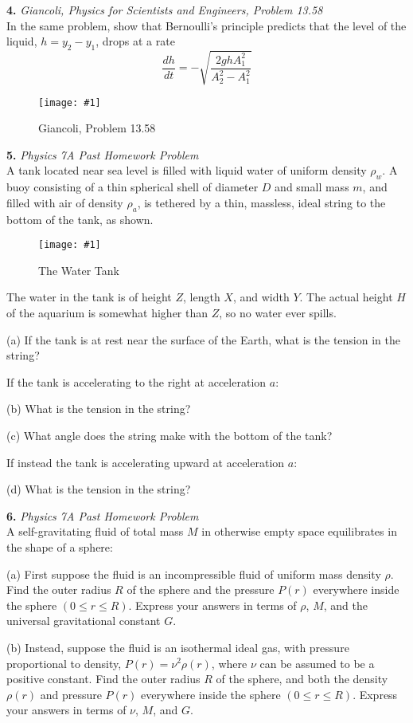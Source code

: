 \documentclass[11pt]{article}
\newcommand{\fig}[4]{
    \begin{figure}[H]
        \centering
        \texttt{[image: \#1]}
        \caption{#2}
        \label{exp4fit}
    \end{figure}
}
\theoremstyle{gangnamstyle}{\newtheorem{definition}{Definition}[]}
\theoremstyle{gangnamstyle}{\newtheorem{example}{Example}[]}
\theoremstyle{gangnamstyle}{\newtheorem{problem}{Problem}[]}
\begin{document}
\pagebreak

\textbf{4.} \textit{Giancoli, Physics for Scientists and Engineers, Problem 13.58} \\
In the same problem, show that Bernoulli’s principle predicts that the level of the liquid, $h = y_2 - y_1$, drops at a rate
\[ \frac{dh}{dt} = -\sqrt{\frac{2ghA_1^2}{A_2^2 - A_1^2}} \]

\fig{figs/0801/tank.png}{Giancoli, Problem 13.58}{0.6}{0}

\pagebreak

\textbf{5.} \textit{Physics 7A Past Homework Problem} \\
A tank located near sea level is filled with liquid water of uniform density $\rho_w$. A buoy consisting of a thin spherical shell of diameter $D$ and small mass $m$, and filled with air of density $\rho_a$, is tethered by a thin, massless, ideal string to the bottom of the tank, as shown. 

\fig{figs/0801/float.png}{The Water Tank}{0.65}{0}

The water in the tank is of height $Z$, length $X$, and width $Y$. The actual height $H$ of the aquarium is somewhat higher than $Z$, so no water ever spills.

(a) If the tank is at rest near the surface of the Earth, what is the tension in the string?

If the tank is accelerating to the right at acceleration $a$:

(b) What is the tension in the string?

(c) What angle does the string make with the bottom of the tank?

If instead the tank is accelerating upward at acceleration $a$:

(d) What is the tension in the string?

\pagebreak

\textbf{6.} \textit{Physics 7A Past Homework Problem} \\
A self-gravitating fluid of total mass $M$ in otherwise empty space equilibrates in the shape of a sphere:

(a) First suppose the fluid is an incompressible fluid of uniform mass density $\rho$. Find the outer radius $R$ of the sphere and the pressure $P(r)$ everywhere inside the sphere $(0 \leq r \leq R)$. Express your answers in terms of $\rho$, $M$, and the universal gravitational constant $G$.

(b) Instead, suppose the fluid is an isothermal ideal gas, with pressure proportional to density, $P(r) = \nu^2\rho(r)$, where $\nu$ can be assumed to be a positive constant. Find the outer radius $R$ of the sphere, and both the density $\rho(r)$ and pressure $P(r)$ everywhere inside the sphere $(0 \leq r \leq R)$. Express your answers in terms of $\nu$, $M$, and $G$.
\end{document}

